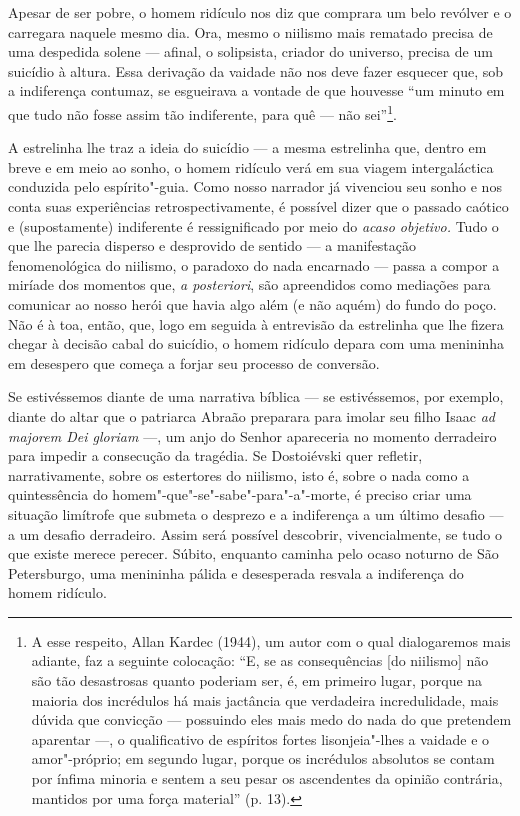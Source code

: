 Apesar de ser pobre, o homem ridículo nos diz que comprara um belo
revólver e o carregara naquele mesmo dia. Ora, mesmo o niilismo mais
rematado precisa de uma despedida solene --- afinal, o solipsista,
criador do universo, precisa de um suicídio à altura. Essa derivação da
vaidade não nos deve fazer esquecer que, sob a indiferença contumaz, se
esgueirava a vontade de que houvesse ``um minuto em que tudo não fosse
assim tão indiferente, para quê --- não sei''\footnote{A esse respeito,
  Allan Kardec (1944), um autor com o qual dialogaremos mais adiante,
  faz a seguinte colocação: ``E, se as consequências {[}do niilismo{]}
  não são tão desastrosas quanto poderiam ser, é, em primeiro lugar,
  porque na maioria dos incrédulos há mais jactância que verdadeira
  incredulidade, mais dúvida que convicção --- possuindo eles mais medo
  do nada do que pretendem aparentar ---, o qualificativo de espíritos
  fortes lisonjeia"-lhes a vaidade e o amor"-próprio; em segundo lugar,
  porque os incrédulos absolutos se contam por ínfima minoria e sentem a
  seu pesar os ascendentes da opinião contrária, mantidos por uma força
  material'' (p. 13).}.

A estrelinha lhe traz a ideia do suicídio --- a mesma estrelinha que,
dentro em breve e em meio ao sonho, o homem ridículo verá em sua viagem
intergaláctica conduzida pelo espírito"-guia. Como nosso narrador já
vivenciou seu sonho e nos conta suas experiências retrospectivamente, é
possível dizer que o passado caótico e (supostamente) indiferente é
ressignificado por meio do \emph{acaso objetivo.} Tudo o que lhe parecia
disperso e desprovido de sentido --- a manifestação fenomenológica do
niilismo, o paradoxo do nada encarnado --- passa a compor a miríade dos
momentos que, \emph{a posteriori}, são apreendidos como mediações para
comunicar ao nosso herói que havia algo além (e não aquém) do fundo do
poço. Não é à toa, então, que, logo em seguida à entrevisão da
estrelinha que lhe fizera chegar à decisão cabal do suicídio, o homem
ridículo depara com uma menininha em desespero que começa a forjar seu
processo de conversão.

Se estivéssemos diante de uma narrativa bíblica --- se estivéssemos, por
exemplo, diante do altar que o patriarca Abraão preparara para imolar
seu filho Isaac \emph{ad majorem Dei gloriam} ---, um anjo do Senhor
apareceria no momento derradeiro para impedir a consecução da tragédia.
Se Dostoiévski quer refletir, narrativamente, sobre os estertores do
niilismo, isto é, sobre o nada como a quintessência do
homem"-que"-se"-sabe"-para"-a"-morte, é preciso criar uma situação limítrofe
que submeta o desprezo e a indiferença a um último desafio --- a um
desafio derradeiro. Assim será possível descobrir, vivencialmente, se
tudo o que existe merece perecer. Súbito, enquanto caminha pelo ocaso
noturno de São Petersburgo, uma menininha pálida e desesperada resvala a
indiferença do homem ridículo.

